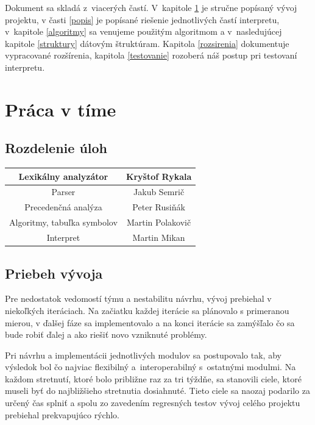 \documentclass[11pt,a4paper]{article}
\begin{document}
Dokument sa skladá z~viacerých častí. V~kapitole \ref{tim} je stručne popísaný vývoj projektu, v časti \ref{popis} je popísané riešenie jednotlivých častí interpretu, v~kapitole \ref{algoritmy} sa venujeme použitým algoritmom a v~nasledujúcej kapitole \ref{struktury} dátovým štruktúram. Kapitola \ref{rozsirenia} dokumentuje vypracované rozšírenia, kapitola \ref{testovanie} rozoberá náš postup pri testovaní interpretu.


\section{Práca v tíme} 
\label{tim}

    \subsection{Rozdelenie úloh}
    \begin{center}
    \begin{tabular}{|c|c|}
    \hline
    Lexikálny analyzátor & Kryštof Rykala \\
    \hline
    Parser & Jakub Semrič \\
    \hline
    Precedenčná analýza & Peter Rusiňák \\
    \hline
    Algoritmy, tabuľka symbolov & Martin Polakovič \\
    \hline
    Interpret & Martin Mikan \\
    \hline
    \end{tabular}
\end{center}
    
    \subsection{Priebeh vývoja}
    \label{vyvoj}
    Pre nedostatok vedomostí týmu a nestabilitu návrhu, vývoj prebiehal v niekoľkých iteráciach. Na začiatku každej iterácie
    sa plánovalo s primeranou mierou, v ďalšej fáze sa implementovalo a na konci iterácie sa zamýšľalo čo sa bude robiť ďalej a
    ako riešiť novo vzniknuté problémy.

    Pri návrhu a implementácii
    jednotlivých modulov sa postupovalo tak, aby výsledok bol čo najviac flexibilný a~interoperabilný s~ostatnými modulmi.
    Na každom stretnutí, ktoré
    bolo približne raz za tri týždňe, sa stanovili ciele, ktoré museli byť do najbližšieho stretnutia dosiahnuté. Tieto ciele
    sa naozaj podarilo za určený čas splniť a spolu zo zavedením regresných testov vývoj celého projektu prebiehal  prekvapujúco
    rýchlo.
\end{document}
